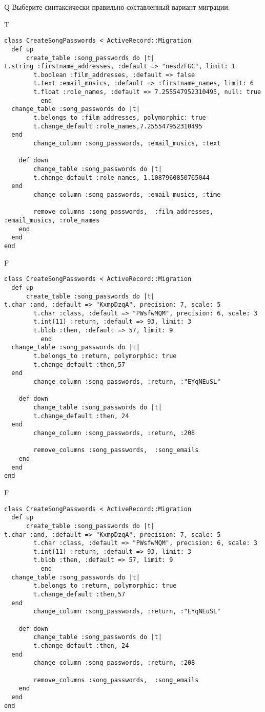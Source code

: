 Q
Выберите синтаксически правильно составленный вариант миграции:

T
\begin{verbatim}
class CreateSongPasswords < ActiveRecord::Migration
  def up
	  create_table :song_passwords do |t|
t.string :firstname_addresses, :default => "nesdzFGC", limit: 1
		t.boolean :film_addresses, :default => false
		t.text :email_musics, :default => :firstname_names, limit: 6
		t.float :role_names, :default => 7.255547952310495, null: true
		  end
  change_table :song_passwords do |t|
		t.belongs_to :film_addresses, polymorphic: true
 		t.change_default :role_names,7.255547952310495
  end
 		change_column :song_passwords, :email_musics, :text
   
	def down
		change_table :song_passwords do |t|
		t.change_default :role_names, 1.1087960850765044
  end
 		change_column :song_passwords, :email_musics, :time
   
		remove_columns :song_passwords,  :film_addresses, :email_musics, :role_names 
    end 
  end
end

\end{verbatim}

F
\begin{verbatim}
class CreateSongPasswords < ActiveRecord::Migration
  def up
	  create_table :song_passwords do |t|
t.char :and, :default => "KxmpDzqA", precision: 7, scale: 5
		t.char :class, :default => "PWsfwMQM", precision: 6, scale: 3
		t.int(11) :return, :default => 93, limit: 3
		t.blob :then, :default => 57, limit: 9
		  end
  change_table :song_passwords do |t|
		t.belongs_to :return, polymorphic: true
 		t.change_default :then,57
  end
 		change_column :song_passwords, :return, :"EYqNEuSL"
   
	def down
		change_table :song_passwords do |t|
		t.change_default :then, 24
  end
 		change_column :song_passwords, :return, :208
   
		remove_columns :song_passwords,  :song_emails 
    end 
  end
end

\end{verbatim}

F
\begin{verbatim}
class CreateSongPasswords < ActiveRecord::Migration
  def up
	  create_table :song_passwords do |t|
t.char :and, :default => "KxmpDzqA", precision: 7, scale: 5
		t.char :class, :default => "PWsfwMQM", precision: 6, scale: 3
		t.int(11) :return, :default => 93, limit: 3
		t.blob :then, :default => 57, limit: 9
		  end
  change_table :song_passwords do |t|
		t.belongs_to :return, polymorphic: true
 		t.change_default :then,57
  end
 		change_column :song_passwords, :return, :"EYqNEuSL"
   
	def down
		change_table :song_passwords do |t|
		t.change_default :then, 24
  end
 		change_column :song_passwords, :return, :208
   
		remove_columns :song_passwords,  :song_emails 
    end 
  end
end

\end{verbatim}

